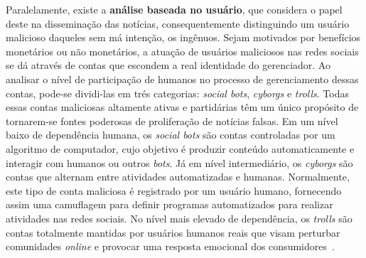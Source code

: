 \documentclass{SBCbookchapter}
\begin{document}
Paralelamente, existe a \textbf{análise baseada no usuário}, que considera o papel deste na disseminação das notícias, consequentemente distinguindo um usuário malicioso daqueles sem má intenção, os ingênuos. Sejam motivados por benefícios monetários ou não monetários, a atuação de usuários maliciosos nas redes sociais se dá através de contas que escondem a real identidade do gerenciador. Ao analisar o nível de participação de humanos no processo de gerenciamento dessas contas, pode-se dividi-las em trés categorias: \textit{social bots}, \textit{cyborgs} e \textit{trolls}. Todas essas contas maliciosas altamente ativas e partidárias têm um único propósito de tornarem-se fontes poderosas de proliferação de notícias falsas. Em um nível baixo de dependência humana, os \textit{social bots} são contas controladas por um algoritmo de computador, cujo objetivo é produzir conteúdo automaticamente e interagir com humanos ou outros \textit{bots}. Já em nível intermediário, os \textit{cyborgs} são contas que alternam entre atividades automatizadas e humanas. Normalmente, este tipo de conta maliciosa é registrado por um usuário humano, fornecendo assim uma camuflagem para definir programas automatizados para realizar atividades nas redes sociais. No nível mais elevado de dependência, os \textit{trolls} são contas totalmente mantidas por usuários humanos reais que visam perturbar comunidades \textit{online} e provocar uma resposta emocional dos consumidores~\cite{shu2017fake}.

\end{document}
